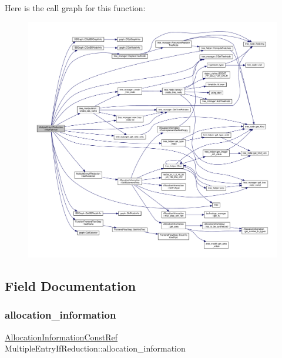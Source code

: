 Here is the call graph for this function\+:
\nopagebreak
\begin{figure}[H]
\begin{center}
\leavevmode
\includegraphics[width=350pt]{d3/d5a/classMultipleEntryIfReduction_abde81c971e9b10ba0626e3c068249fbe_cgraph}
\end{center}
\end{figure}


\subsection{Field Documentation}
\mbox{\label{classMultipleEntryIfReduction_a2412aea74a8efc60dfe1516f6659bbed}} 
\subsubsection{\texorpdfstring{allocation\+\_\+information}{allocation\_information}}
{\footnotesize\ttfamily \hyperlink{allocation__information_8hpp_a54287618a63bf87e31ddb17ba01e7ca7}{Allocation\+Information\+Const\+Ref} Multiple\+Entry\+If\+Reduction\+::allocation\+\_\+information\hspace{0.3cm}{\ttfamily [private]}}



